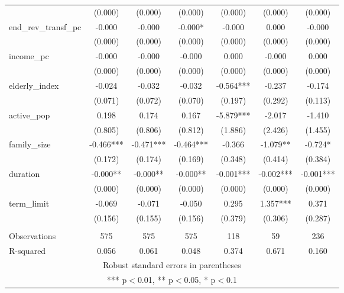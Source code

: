 \documentclass[]{article}
\begin{document}
\begin{tabular}{lcccccc}
 & (0.000) & (0.000) & (0.000) & (0.000) & (0.000) & (0.000) \\
end\_rev\_transf\_pc & -0.000 & -0.000 & -0.000* & -0.000 & 0.000 & -0.000 \\
 & (0.000) & (0.000) & (0.000) & (0.000) & (0.000) & (0.000) \\
income\_pc & -0.000 & -0.000 & -0.000 & 0.000 & -0.000 & 0.000 \\
 & (0.000) & (0.000) & (0.000) & (0.000) & (0.000) & (0.000) \\
elderly\_index & -0.024 & -0.032 & -0.032 & -0.564*** & -0.237 & -0.174 \\
 & (0.071) & (0.072) & (0.070) & (0.197) & (0.292) & (0.113) \\
active\_pop & 0.198 & 0.174 & 0.167 & -5.879*** & -2.017 & -1.410 \\
 & (0.805) & (0.806) & (0.812) & (1.886) & (2.426) & (1.455) \\
family\_size & -0.466*** & -0.471*** & -0.464*** & -0.366 & -1.079** & -0.724* \\
 & (0.172) & (0.174) & (0.169) & (0.348) & (0.414) & (0.384) \\
duration & -0.000** & -0.000** & -0.000** & -0.001*** & -0.002*** & -0.001*** \\
 & (0.000) & (0.000) & (0.000) & (0.000) & (0.000) & (0.000) \\
term\_limit & -0.069 & -0.071 & -0.050 & 0.295 & 1.357*** & 0.371 \\
 & (0.156) & (0.155) & (0.156) & (0.379) & (0.306) & (0.287) \\
 &  &  &  &  &  &  \\
Observations & 575 & 575 & 575 & 118 & 59 & 236 \\
 R-squared & 0.056 & 0.061 & 0.048 & 0.374 & 0.671 & 0.160 \\ \hline
\multicolumn{7}{c}{ Robust standard errors in parentheses} \\
\multicolumn{7}{c}{ *** p$<$0.01, ** p$<$0.05, * p$<$0.1} \\
\end{tabular}
\end{document}
